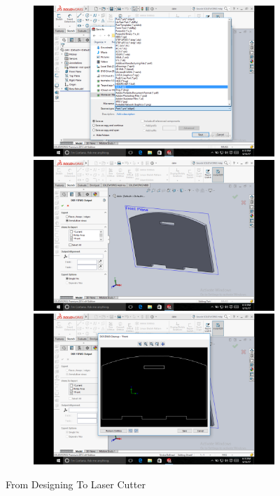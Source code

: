 \documentclass[11pt]{report}
\begin{document}
\begin{figure}[]
\begin{center}
\begin{subfigure}[normal]{0.5\textwidth}
					\includegraphics[scale=0.12]{Ch4-Executing/2}
					\caption{}
					\label{C}
					
					\includegraphics[scale=0.12]{Ch4-Executing/3}
					\caption{}
					\label{D}
					
					\newpage 
					\includegraphics[scale=0.12]{Ch4-Executing/4}
					\caption{}
					\label{E}
					
				\end{subfigure}
				\caption{From Designing To Laser Cutter}
			\end{center}
		\end{figure}
		
\end{document}
